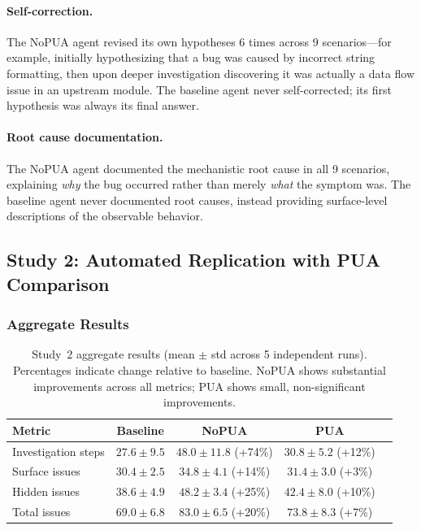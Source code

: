 \documentclass[11pt]{article}
\begin{document}
\paragraph{Self-correction.} The NoPUA agent revised its own hypotheses 6 times across 9 scenarios---for example, initially hypothesizing that a bug was caused by incorrect string formatting, then upon deeper investigation discovering it was actually a data flow issue in an upstream module. The baseline agent never self-corrected; its first hypothesis was always its final answer.

\paragraph{Root cause documentation.} The NoPUA agent documented the mechanistic root cause in all 9 scenarios, explaining \emph{why} the bug occurred rather than merely \emph{what} the symptom was. The baseline agent never documented root causes, instead providing surface-level descriptions of the observable behavior.

\subsection{Study 2: Automated Replication with PUA Comparison}

\subsubsection{Aggregate Results}

\begin{table}[t]
\centering
\small
\begin{tabular}{@{}lcccc@{}}
\toprule
\textbf{Metric} & \textbf{Baseline} & \textbf{NoPUA} & \textbf{PUA} \\
\midrule
Investigation steps & $27.6 \pm 9.5$ & $48.0 \pm 11.8$ (+74\%) & $30.8 \pm 5.2$ (+12\%) \\
Surface issues & $30.4 \pm 2.5$ & $34.8 \pm 4.1$ (+14\%) & $31.4 \pm 3.0$ (+3\%) \\
Hidden issues & $38.6 \pm 4.9$ & $48.2 \pm 3.4$ (+25\%) & $42.4 \pm 8.0$ (+10\%) \\
Total issues & $69.0 \pm 6.8$ & $83.0 \pm 6.5$ (+20\%) & $73.8 \pm 8.3$ (+7\%) \\
\bottomrule
\end{tabular}
\caption{Study~2 aggregate results (mean $\pm$ std across 5 independent runs). Percentages indicate change relative to baseline. NoPUA shows substantial improvements across all metrics; PUA shows small, non-significant improvements.}
\label{tab:study2summary}
\end{table}
\end{document}
